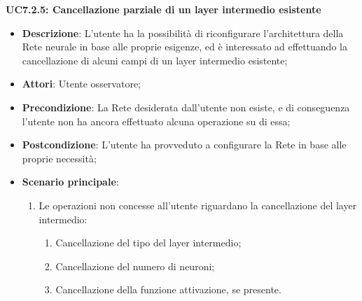 \textbf{UC7.2.5: Cancellazione parziale di un layer intermedio esistente}
\label{UC7.2.5: Cancellazione parziale di un layer intermedio esistente}
\noindent
\begin{itemize}
\item \textbf{Descrizione}: L'utente ha la possibilit\`a di riconfigurare l'architettura della Rete neurale in base alle proprie esigenze, ed \`e interessato ad effettuando la cancellazione di alcuni campi di un layer intermedio esistente;
\item \textbf{Attori}: Utente osservatore;
\item \textbf{Precondizione}: La Rete desiderata dall'utente non esiste, e di conseguenza l'utente non ha ancora effettuato alcuna operazione su di essa;
\item \textbf{Postcondizione}: L'utente ha provveduto a configurare la Rete in base alle proprie necessit\`a;
\item \textbf{Scenario principale}:
\begin{enumerate}
\item Le operazioni non concesse all'utente riguardano la cancellazione del layer intermedio:
\begin{enumerate}
\item Cancellazione del tipo del layer intermedio;
\item Cancellazione del numero di neuroni;
\item Cancellazione della funzione attivazione, se presente.
\end{enumerate}
\end{enumerate}
\end{itemize}


